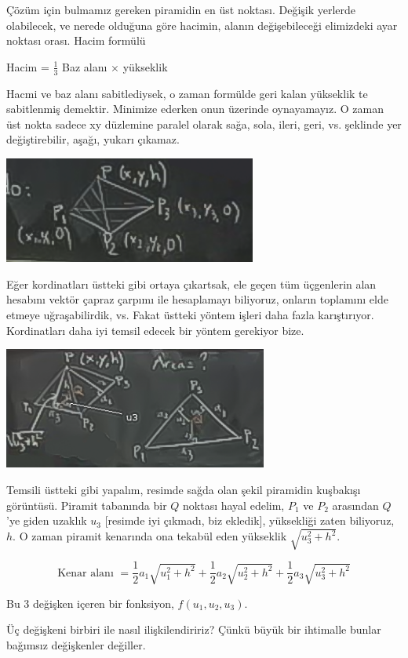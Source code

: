 \documentclass[12pt,fleqn]{article}\usepackage{../../common}
\begin{document}
Çözüm için bulmamız gereken piramidin en üst noktası. Değişik yerlerde
olabilecek, ve nerede olduğuna göre hacimin, alanın değişebileceği
elimizdeki ayar noktası orası. Hacim formülü

Hacim = $\frac{1}{3}$ Baz alanı $\times$ yükseklik

Hacmi ve baz alanı sabitlediysek, o zaman formülde geri kalan yükseklik te
sabitlenmiş demektir. Minimize ederken onun üzerinde oynayamayız. O zaman
üst nokta sadece xy düzlemine paralel olarak sağa, sola, ileri, geri,
vs. şeklinde yer değiştirebilir, aşağı, yukarı çıkamaz. 

\includegraphics[height=3.5cm]{13_9.png}

Eğer kordinatları üstteki gibi ortaya çıkartsak, ele geçen tüm üçgenlerin
alan hesabını vektör çapraz çarpımı ile hesaplamayı biliyoruz, onların
toplamını elde etmeye uğraşabilirdik, vs. Fakat üstteki yöntem işleri daha
fazla karıştırıyor. Kordinatları daha iyi temsil edecek bir yöntem
gerekiyor bize.

\includegraphics[height=4cm]{13_10.png}

Temsili üstteki gibi yapalım, resimde sağda olan şekil piramidin kuşbakışı
görüntüsü. Piramit tabanında bir $Q$ noktası hayal edelim, $P_1$  ve $P_2$
arasından $Q$'ye giden uzaklık $u_3$ [resimde iyi çıkmadı, biz ekledik],
yüksekliği zaten biliyoruz, $h$. O zaman piramit kenarında ona tekabül eden
yükseklik $\sqrt{u_3^2 + h^2}$. 

$$ \textrm{Kenar alanı } = 
\frac{1}{2}a_1 \sqrt{u_1^2 + h^2} + 
\frac{1}{2}a_2 \sqrt{u_2^2 + h^2} + 
\frac{1}{2}a_3 \sqrt{u_3^2 + h^2} 
 $$

Bu 3 değişken içeren bir fonksiyon, $f(u_1,u_2,u_3)$. 

Üç değişkeni birbiri ile nasıl ilişkilendiririz? Çünkü büyük bir ihtimalle
bunlar bağımsız değişkenler değiller.
\end{document}
